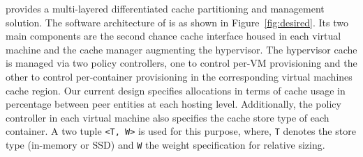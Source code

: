 \dd{} provides a 
multi-layered differentiated cache partitioning and management solution.
%
The software architecture of \dd{} is as shown in Figure~\ref{fig:desired}.
Its two main components are the second chance cache interface housed
in each virtual machine and the \dd{} cache manager augmenting the 
hypervisor.
%
The hypervisor cache is managed via two policy controllers,
one to control per-VM provisioning and the other
to control per-container provisioning in the corresponding
virtual machines cache region.
%
Our current design specifies allocations in terms of cache 
usage  in percentage between peer entities at 
each hosting level. 
%
Additionally, the policy controller in each virtual machine
also specifies the cache store type of each container.
%
A two tuple \texttt{<T, W>} is used for this purpose,
where, \texttt{T} denotes the store type (in-memory or SSD)
and \texttt{W} the weight specification for relative sizing.
%
%
%

